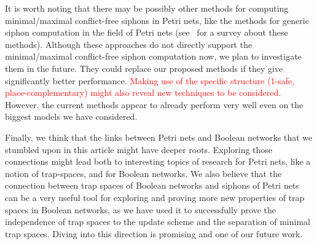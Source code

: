 \documentclass[preprint,12pt]{elsarticle}
\newcommand{\change}[1]{\textcolor{red}{#1}}
\begin{document}
It is worth noting that there may be possibly other methods for computing minimal/maximal conflict-free siphons in Petri nets, like the methods for generic siphon computation in the field of Petri nets (see~\cite{DBLP:journals/isci/LiuB16} for a survey about these methods).
Although these approaches do not directly support the minimal/maximal conflict-free siphon computation now, we plan to investigate them in the future.
They could replace our proposed methods if they give significantly better performance.
\change{Making use of the specific structure (1-safe, place-complementary) might also reveal new techniques to be considered.}
However, the current methods appear to already perform very well even on the biggest models we have considered.

Finally, we think that the links between Petri nets and Boolean networks that we stumbled upon in this article might have deeper roots.
Exploring those connections might lead both to interesting topics of research for Petri nets, like a notion of trap-spaces, and for Boolean networks.
We also believe that the connection between trap spaces of Boolean networks and siphons of Petri nets can be a very useful tool for exploring and proving more new properties of trap spaces in Boolean networks, as we have used it to successfully prove the independence of trap spaces to the update scheme and the separation of minimal trap spaces.
Diving into this direction is promising and one of our future work.




\end{document}
